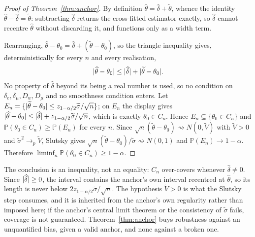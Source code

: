 \documentclass[11pt]{article}
\theoremstyle{plain}
\theoremstyle{definition}
\theoremstyle{remark}
\newcommand{\PP}{\mathbb{P}}
\newcommand{\thetahat}{\widehat{\theta}}
\newcommand{\thetatil}{\widetilde{\theta}}
\newcommand{\Dw}{D_w}
\newcommand{\Dm}{D_\mu}
\DeclarePairedDelimiter{\abs}{\lvert}{\rvert}
\begin{document}
\begin{proof}[Proof of Theorem~\ref{thm:anchor}]
By definition $\thetahat=\widehat\delta+\thetatil$, whence the identity
$\thetahat-\widehat\delta=\thetatil$: subtracting $\widehat\delta$ returns the
cross-fitted estimator exactly, so $\widehat\delta$ cannot recentre $\thetahat$
without discarding it, and functions only as a width term.

Rearranging, $\thetahat-\theta_0=\widehat\delta+(\thetatil-\theta_0)$, so the
triangle inequality gives, deterministically for every $n$ and every realisation,
\[
  \abs{\thetahat-\theta_0}\le\abs{\widehat\delta}+\abs{\thetatil-\theta_0}.
\]
No property of $\widehat\delta$ beyond its being a real number is used, so no
condition on $\delta_e,\delta_\mu,\Dw,\Dm$ and no smoothness condition enters.
Let $E_n=\{\abs{\thetatil-\theta_0}\le z_{1-\alpha/2}\widetilde\sigma/\sqrt n\}$;
on $E_n$ the display gives
$\abs{\thetahat-\theta_0}\le\abs{\widehat\delta}
+z_{1-\alpha/2}\widetilde\sigma/\sqrt n$, which is exactly $\theta_0\in C_n$.
Hence $E_n\subseteq\{\theta_0\in C_n\}$ and
$\PP(\theta_0\in C_n)\ge\PP(E_n)$ for every $n$. Since
$\sqrt n(\thetatil-\theta_0)\rightsquigarrow N(0,\widetilde V)$ with
$\widetilde V>0$ and $\widetilde\sigma^2\to_p\widetilde V$, Slutsky gives
$\sqrt n(\thetatil-\theta_0)/\widetilde\sigma\rightsquigarrow N(0,1)$ and
$\PP(E_n)\to1-\alpha$. Therefore
$\liminf_n\PP(\theta_0\in C_n)\ge1-\alpha$.
\end{proof}

\noindent The conclusion is an inequality, not an equality: $C_n$ over-covers
whenever $\widehat\delta\ne0$. Since $\abs{\widehat\delta}\ge0$, the interval
contains the anchor's own interval recentred at $\thetahat$, so its length is
never below $2z_{1-\alpha/2}\widetilde\sigma/\sqrt n$. The hypothesis
$\widetilde V>0$ is what the Slutsky step consumes, and it is inherited from the
anchor's own regularity rather than imposed here; if the anchor's central limit
theorem or the consistency of $\widetilde\sigma$ fails, coverage is not
guaranteed. Theorem~\ref{thm:anchor} buys robustness against an unquantified
bias, given a valid anchor, and none against a broken one.
\end{document}
